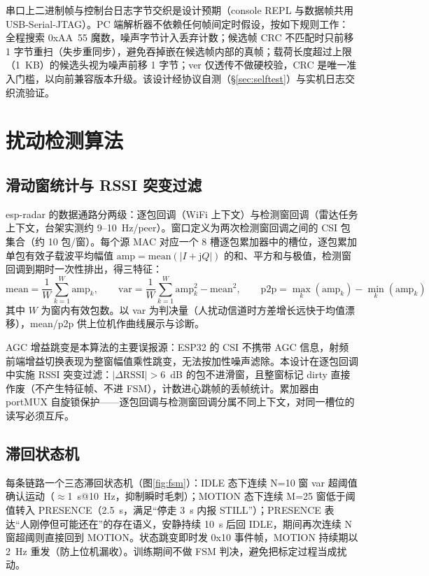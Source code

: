 串口上二进制帧与控制台日志字节交织是设计预期（console REPL 与数据帧共用 USB-Serial-JTAG）。PC 端解析器不依赖任何帧间定时假设，按如下规则工作：全程搜索 0xAA~55 魔数，噪声字节计入丢弃计数；候选帧 CRC 不匹配时只前移 1 字节重扫（失步重同步），避免吞掉嵌在候选帧内部的真帧；载荷长度超过上限（1~KB）的候选头视为噪声前移 1 字节；ver 仅透传不做硬校验，CRC 是唯一准入门槛，以向前兼容版本升级。该设计经协议自测（\S\ref{sec:selftest}）与实机日志交织流验证。

\section{扰动检测算法}\label{sec:alg}

\subsection{滑动窗统计与 RSSI 突变过滤}

esp-radar 的数据通路分两级：逐包回调（WiFi 上下文）与检测窗回调（雷达任务上下文，台架实测约 9--10~Hz/peer）。窗口定义为两次检测窗回调之间的 CSI 包集合（约 10 包/窗）。每个源 MAC 对应一个 8 槽逐包累加器中的槽位，逐包累加单包有效子载波平均幅值 $\text{amp}=\text{mean}(|I+\mathrm{j}Q|)$ 的和、平方和与极值，检测窗回调到期时一次性排出，得三特征：
\[
\text{mean}=\frac{1}{W}\sum_{k=1}^{W}\text{amp}_k,\qquad
\text{var}=\frac{1}{W}\sum_{k=1}^{W}\text{amp}_k^2-\text{mean}^2,\qquad
\text{p2p}=\max_k(\text{amp}_k)-\min_k(\text{amp}_k)
\]
其中 $W$ 为窗内有效包数。以 var 为判决量（人扰动信道时方差增长远快于均值漂移），mean/p2p 供上位机作曲线展示与诊断。

AGC 增益跳变是本算法的主要误报源：ESP32 的 CSI 不携带 AGC 信息，射频前端增益切换表现为整窗幅值乘性跳变，无法按加性噪声滤除\cite{ref:agc185,ref:csisim}。本设计在逐包回调中实施 RSSI 突变过滤：$|\Delta\text{RSSI}|>6$~dB 的包不进滑窗，且整窗标记 dirty 直接作废（不产生特征帧、不进 FSM），计数进心跳帧的丢帧统计。累加器由 portMUX 自旋锁保护——逐包回调与检测窗回调分属不同上下文，对同一槽位的读写必须互斥。

\subsection{滞回状态机}

每条链路一个三态滞回状态机（图\ref{fig:fsm}）：IDLE 态下连续 N=10 窗 var 超阈值确认运动（$\approx$1~s@10~Hz，抑制瞬时毛刺）；MOTION 态下连续 M=25 窗低于阈值转入 PRESENCE（2.5~s，满足“停走 3~s 内报 STILL”）；PRESENCE 表达“人刚停但可能还在”的存在语义，安静持续 10~s 后回 IDLE，期间再次连续 N 窗超阈则直接回到 MOTION。状态跳变即时发 0x10 事件帧，MOTION 持续期以 2~Hz 重发（防上位机漏收）。训练期间不做 FSM 判决，避免把标定过程当成扰动。


